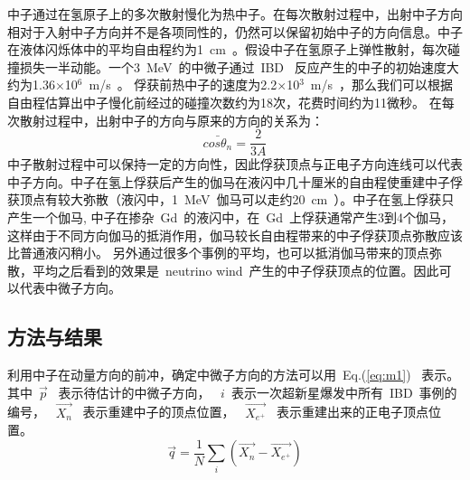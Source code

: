 中子通过在氢原子上的多次散射慢化为热中子。在每次散射过程中，出射中子方向相对于入射中子方向并不是各项同性的，仍然可以保留初始中子的方向信息。中子在液体闪烁体中的平均自由程约为1~cm~。假设中子在氢原子上弹性散射，每次碰撞损失一半动能。一个3~MeV~的中微子通过~IBD~ 反应产生的中子的初始速度大约为1.36$\times$10$^6$~m/s~。 俘获前热中子的速度为2.2$\times$10$^3$~m/s~，那么我们可以根据自由程估算出中子慢化前经过的碰撞次数约为18次，花费时间约为11微秒。 在每次散射过程中，出射中子的方向与原来的方向的关系为：
\begin{equation}\label{eq:flux}
\bar{cos\theta_n}=\frac{2}{3A}
\end{equation}
中子散射过程中可以保持一定的方向性，因此俘获顶点与正电子方向连线可以代表中子方向。中子在氢上俘获后产生的伽马在液闪中几十厘米的自由程使重建中子俘获顶点有较大弥散（液闪中，1~MeV~伽马可以走约20~cm~）。中子在氢上俘获只产生一个伽马, 中子在掺杂~Gd~的液闪中，在~Gd~上俘获通常产生3到4个伽马，这样由于不同方向伽马的抵消作用，伽马较长自由程带来的中子俘获顶点弥散应该比普通液闪稍小。%
另外通过很多个事例的平均，也可以抵消伽马带来的顶点弥散，平均之后看到的效果是~neutrino wind~产生的中子俘获顶点的位置。因此可以代表中微子方向。
\subsection{方法与结果}
利用中子在动量方向的前冲，确定中微子方向的方法可以用~Eq.(\ref{eq:m1})~ 表示。其中~$\vec{p}$~ 表示待估计的中微子方向， ~$i$~表示一次超新星爆发中所有~IBD~事例的编号， ~$\vec{X_{n}}$~ 表示重建中子的顶点位置， ~$\vec{X_{e^+}}$~ 表示重建出来的正电子顶点位置。
\begin{equation}\label{eq:m1}
\vec{q} = \frac{1}{N}\sum_{i}(\vec{X_{n}}-\vec{X_{e^+}})
\end{equation}

